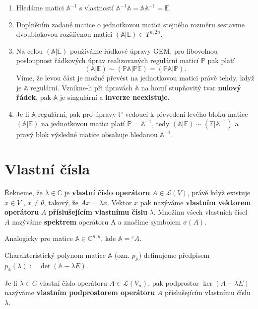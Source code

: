 \documentclass{szzclass}
\newcommand*{\trans}[3]{{}^{#1}#2^{#3}}
\begin{document}
\begin{enumerate}
\item Hledáme matici $\mathbb{A}^{-1}$ s vlastností $\mathbb{A}^{-1}\mathbb{A} = \mathbb{A}\mathbb{A}^{-1} = \mathbb{E}$.
\item Doplněním zadané matice o jednotkovou matici stejného rozměru sestavme dvoublokovou rozšířenou matici $(\mathbb{A} | \mathbb{E}) \in T^{n,2n}$.
\item Na celou $(\mathbb{A} | \mathbb{E})$ používáme řádkové úpravy GEM, pro libovolnou posloupnost řádkových úprav realizovaných regulární maticí $\mathbb{P}$ pak platí
\[
  (\mathbb{A} | \mathbb{E}) \sim (\mathbb{P}\mathbb{A} | \mathbb{P}\mathbb{E}) = (\mathbb{P}\mathbb{A} | \mathbb{P}).
\]
Víme, že levou část je možné převést na jednotkovou matici právě tehdy, když je $\mathbb{A}$ regulární. Vznikne-li při úpravách $\mathbb{A}$ na horní stupňovitý tvar \textbf{nulový řádek}, pak $\mathbb{A}$ je singulární a \textbf{inverze neexistuje}.
\item Je-li $\mathbb{A}$ regulární, pak pro úpravy $\mathbb{P}$ vedoucí k převedení levého bloku matice $(\mathbb{A} | \mathbb{E})$ na jednotkovou matici platí $\mathbb{P} = \mathbb{A}^{-1}$, tedy $(\mathbb{A} | \mathbb{E}) \sim (\mathbb{E} | \mathbb{A}^{-1})$ a pravý blok výsledné matice obsahuje hledanou $\mathbb{A}^{-1}$.
\end{enumerate}

\section{Vlastní čísla}
\begin{definition}
Řekneme, že $\lambda \in \mathbb{C}$ je \textbf{vlastní číslo operátoru} $A \in \mathcal{L}(V)$, právě když existuje $x \in V$ , $x \neq \theta$, takový, že $Ax = \lambda x$. Vektor $x$ pak nazýváme \textbf{vlastním vektorem operátoru} $A$ \textbf{příslušejícím vlastnímu číslu} $\lambda$. Množinu všech vlastních čísel $A$ nazýváme \textbf{spektrem} operátoru A a značíme symbolem $\sigma(A)$.

Analogicky pro matice $\mathbb{A}\in \mathbb{C}^{n,n}$, kde $\mathbb{A}=\trans{\varepsilon}{A}{}$.

Charakteristický polynom matice $\mathbb{A}$ (ozn. $p_\mathbb{A}$) definujeme předpisem $p_\mathbb{A}(\lambda) := \det(\mathbb{A} - \lambda E)$.
\end{definition}

\begin{definition}
Je-li $\lambda \in C$ vlastní číslo operátoru $A \in \mathcal{L}(V_n)$, pak podprostor $\ker{(A-
\lambda E)}$ nazýváme \textbf{vlastním podprostorem operátoru} $A$ příslušejícím vlastnímu
číslu $\lambda$.
\end{definition}
\end{document}
